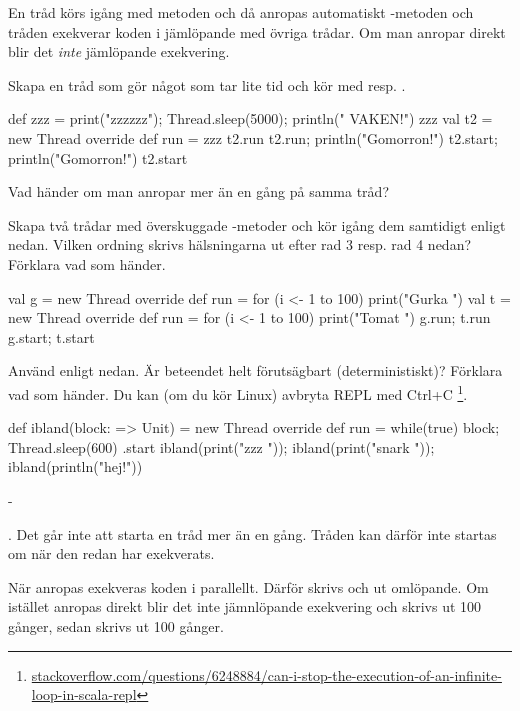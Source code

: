 En tråd körs igång med metoden  och då anropas automatiskt -metoden och tråden exekverar koden i  jämlöpande med övriga trådar. Om man anropar  direkt blir det \emph{inte} jämlöpande exekvering.

\Subtask Skapa en tråd som gör något som tar lite tid och kör med  resp. .
\begin{REPL}
def zzz = { print("zzzzzz"); Thread.sleep(5000); println(" VAKEN!")}
zzz
val t2 = new Thread{ override def run = zzz }
t2.run
t2.run; println("Gomorron!")
t2.start; println("Gomorron!")
t2.start
\end{REPL}

\Subtask Vad händer om man anropar  mer än en gång på samma tråd?

\Subtask Skapa två trådar med överskuggade -metoder och kör igång dem samtidigt enligt nedan. Vilken ordning skrivs hälsningarna ut efter rad 3 resp. rad 4 nedan? Förklara vad som händer.
\begin{REPL}
val g = new Thread{ override def run = for (i <- 1 to 100) print("Gurka ") }
val t = new Thread{ override def run = for (i <- 1 to 100) print("Tomat ") }
g.run; t.run
g.start; t.start
\end{REPL}

\Subtask Använd  enligt nedan. Är beteendet helt förutsägbart (deterministiskt)? Förklara vad som händer. Du kan (om du kör Linux) avbryta REPL med Ctrl+C%
\footnote{\href{http://stackoverflow.com/questions/6248884/can-i-stop-the-execution-of-an-infinite-loop-in-scala-repl}{stackoverflow.com/questions/6248884/can-i-stop-the-execution-of-an-infinite-loop-in-scala-repl}}.
\begin{REPL}
def ibland(block: => Unit) = new Thread {
  override def run = while(true) { block; Thread.sleep(600) }
}.start
ibland(print("zzz ")); ibland(print("snark ")); ibland(println("hej!"))
\end{REPL}


\SOLUTION


\TaskSolved \what

\SubtaskSolved   -

\SubtaskSolved  {}. Det går inte att starta en tråd mer än en gång. Tråden kan därför inte startas om när den redan har exekverats.

\SubtaskSolved   När  anropas exekveras koden i  parallellt. Därför skrivs  och  ut omlöpande. Om istället  anropas direkt blir det inte jämnlöpande exekvering och  skrivs ut 100 gånger, sedan skrivs  ut 100 gånger.

